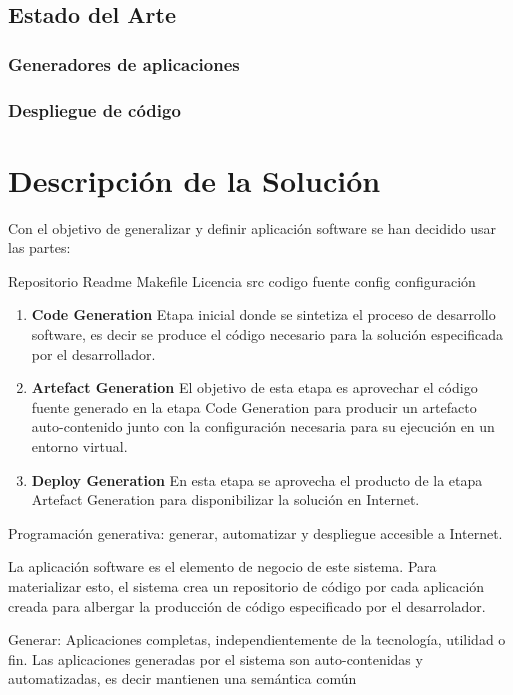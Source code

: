 \documentclass[a4paper,11pt]{book}
\begin{document}
\section{Estado del Arte}
\subsection{Generadores de aplicaciones}
\subsection{Despliegue de código}
 

\chapter{Descripción de la Solución}


Con el objetivo de generalizar y definir aplicación software se han decidido usar las partes:

Repositorio
Readme
Makefile
Licencia
src codigo fuente
config configuración


\begin{enumerate}
\item \textbf{ Code Generation }  Etapa inicial donde se sintetiza el proceso de desarrollo software, es decir se produce el código necesario para la solución especificada por el desarrollador. 
\item \textbf{ Artefact Generation }  El objetivo de esta etapa es aprovechar el código fuente generado en la etapa Code Generation para producir un artefacto auto-contenido junto con la configuración necesaria para su ejecución en un entorno virtual. 
\item \textbf{ Deploy Generation } En esta etapa se aprovecha el producto de la etapa Artefact Generation para disponibilizar la solución en Internet. 
\end{enumerate}


Programación generativa: generar, automatizar  y despliegue accesible a Internet.


La aplicación software es el elemento de negocio de este sistema.  Para materializar esto, el sistema crea un repositorio de código por cada aplicación creada para albergar la producción de código especificado por  el desarrolador. 


Generar: Aplicaciones completas, independientemente de la tecnología, utilidad o fin. Las aplicaciones generadas por el sistema
son auto-contenidas y automatizadas, es decir mantienen una semántica común 
\end{document}
